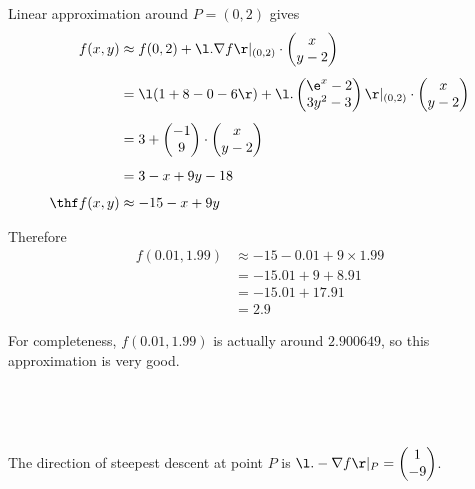 \documentclass[a4paper]{article}
\begin{document}
Linear approximation around $P = (0, 2)$ gives \begin{align*}
f(x, y) &\approx f(0, 2) + \l. \nabla f \r|_{(0,2)} \cdot \begin{pmatrix}x\\ y-2\end{pmatrix}\\[1ex]
&= \l( 1 + 8 - 0 - 6 \r) + \l. \begin{pmatrix}\e^x - 2\\ 3y^2 - 3\end{pmatrix} \r|_{(0,2)} \cdot \begin{pmatrix}x\\ y-2\end{pmatrix}\\[1ex]
&= 3 + \begin{pmatrix}-1\\ 9\end{pmatrix} \cdot \begin{pmatrix}x\\ y-2\end{pmatrix}\\[1ex]
&= 3 -x + 9y - 18\\[1ex]
\thf f(x, y) &\approx -15 -x + 9y
\end{align*}

Therefore \begin{align*}
f(0.01, 1.99) &\approx -15 - 0.01 + 9 \times 1.99\\
&= -15.01 + 9 + 8.91\\
&= -15.01 + 17.91\\
&= 2.9
\end{align*}

For completeness, $f(0.01, 1.99)$ is actually around $2.900649$, so this approximation is very good.

\subsection{~}

The direction of steepest descent at point $P$ is $\l. -\nabla f \r|_P = \begin{pmatrix}1\\ -9\end{pmatrix}$.
\end{document}
